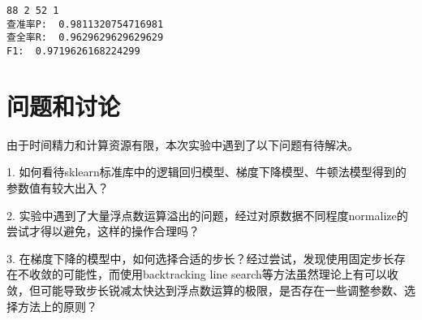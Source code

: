 \documentclass[11pt]{article}
\begin{document}
    \begin{Verbatim}[commandchars=\\\{\}]
88 2 52 1
查准率P:  0.9811320754716981
查全率R:  0.9629629629629629
F1:  0.9719626168224299
    \end{Verbatim}

    \section{问题和讨论}\label{ux95eeux9898ux548cux8ba8ux8bba}

由于时间精力和计算资源有限，本次实验中遇到了以下问题有待解决。 

1.
如何看待sklearn标准库中的逻辑回归模型、梯度下降模型、牛顿法模型得到的参数值有较大出入？

2.
实验中遇到了大量浮点数运算溢出的问题，经过对原数据不同程度normalize的尝试才得以避免，这样的操作合理吗？

3.
在梯度下降的模型中，如何选择合适的步长？经过尝试，发现使用固定步长存在不收敛的可能性，而使用backtracking
line
search等方法虽然理论上有可以收敛，但可能导致步长锐减太快达到浮点数运算的极限，是否存在一些调整参数、选择方法上的原则？


    
    
    
\end{document}
